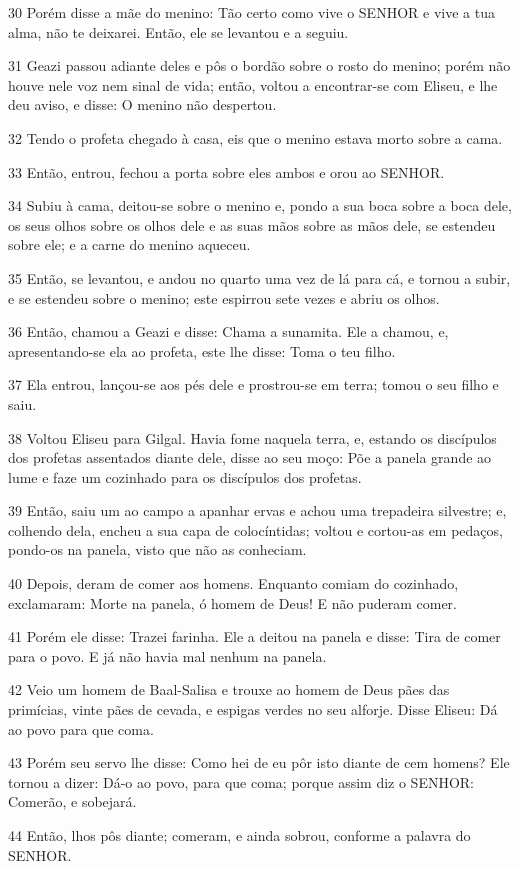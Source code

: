 \par 30 Porém disse a mãe do menino: Tão certo como vive o SENHOR e vive a tua alma, não te deixarei. Então, ele se levantou e a seguiu.
\par 31 Geazi passou adiante deles e pôs o bordão sobre o rosto do menino; porém não houve nele voz nem sinal de vida; então, voltou a encontrar-se com Eliseu, e lhe deu aviso, e disse: O menino não despertou.
\par 32 Tendo o profeta chegado à casa, eis que o menino estava morto sobre a cama.
\par 33 Então, entrou, fechou a porta sobre eles ambos e orou ao SENHOR.
\par 34 Subiu à cama, deitou-se sobre o menino e, pondo a sua boca sobre a boca dele, os seus olhos sobre os olhos dele e as suas mãos sobre as mãos dele, se estendeu sobre ele; e a carne do menino aqueceu.
\par 35 Então, se levantou, e andou no quarto uma vez de lá para cá, e tornou a subir, e se estendeu sobre o menino; este espirrou sete vezes e abriu os olhos.
\par 36 Então, chamou a Geazi e disse: Chama a sunamita. Ele a chamou, e, apresentando-se ela ao profeta, este lhe disse: Toma o teu filho.
\par 37 Ela entrou, lançou-se aos pés dele e prostrou-se em terra; tomou o seu filho e saiu.
\par 38 Voltou Eliseu para Gilgal. Havia fome naquela terra, e, estando os discípulos dos profetas assentados diante dele, disse ao seu moço: Põe a panela grande ao lume e faze um cozinhado para os discípulos dos profetas.
\par 39 Então, saiu um ao campo a apanhar ervas e achou uma trepadeira silvestre; e, colhendo dela, encheu a sua capa de colocíntidas; voltou e cortou-as em pedaços, pondo-os na panela, visto que não as conheciam.
\par 40 Depois, deram de comer aos homens. Enquanto comiam do cozinhado, exclamaram: Morte na panela, ó homem de Deus! E não puderam comer.
\par 41 Porém ele disse: Trazei farinha. Ele a deitou na panela e disse: Tira de comer para o povo. E já não havia mal nenhum na panela.
\par 42 Veio um homem de Baal-Salisa e trouxe ao homem de Deus pães das primícias, vinte pães de cevada, e espigas verdes no seu alforje. Disse Eliseu: Dá ao povo para que coma.
\par 43 Porém seu servo lhe disse: Como hei de eu pôr isto diante de cem homens? Ele tornou a dizer: Dá-o ao povo, para que coma; porque assim diz o SENHOR: Comerão, e sobejará.
\par 44 Então, lhos pôs diante; comeram, e ainda sobrou, conforme a palavra do SENHOR.

